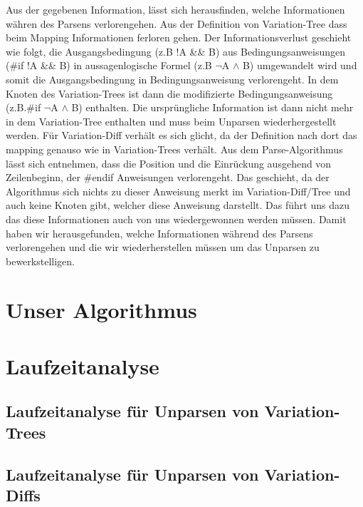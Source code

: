 Aus der gegebenen Information, lässt sich herausfinden, welche Informationen währen des Parsens verlorengehen. Aus der Definition von Variation-Tree dass beim Mapping Informationen ferloren gehen. Der Informationsverlust geschieht wie folgt, die Ausgangsbedingung (z.B !A \&\& B) aus Bedingungsanweisungen (\#if !A \&\& B) in aussagenlogische Formel (z.B $\lnot$A $\land$ B) umgewandelt wird und somit die Ausgangsbedingung in Bedingungsanweisung verlorengeht. In dem Knoten des Variation-Trees ist dann die modifizierte Bedingungsanweisung (z.B.\#if $\lnot$A $\land$ B) enthalten. Die ursprüngliche Information ist dann nicht mehr in dem Variation-Tree enthalten und muss beim Unparsen wiederhergestellt werden. Für Variation-Diff verhält es sich glicht, da der Definition nach dort das mapping genauso wie in Variation-Trees verhält. Aus dem Parse-Algorithmus lässt sich entnehmen, dass die Position und die Einrückung ausgehend von Zeilenbeginn, der \#endif Anweisungen verlorengeht. Das geschieht, da der Algorithmus sich nichts zu dieser Anweisung merkt im Variation-Diff/Tree und auch keine Knoten gibt, welcher diese Anweisung darstellt. Das führt uns dazu das diese Informationen auch von uns wiedergewonnen werden müssen. Damit haben wir herausgefunden, welche Informationen während des Parsens verlorengehen und die wir wiederherstellen müssen um das Unparsen zu bewerkstelligen.






\section{Unser Algorithmus}



\section{Laufzeitanalyse}
\subsection{Laufzeitanalyse für Unparsen von Variation-Trees}

\subsection{Laufzeitanalyse für Unparsen von Variation-Diffs}








